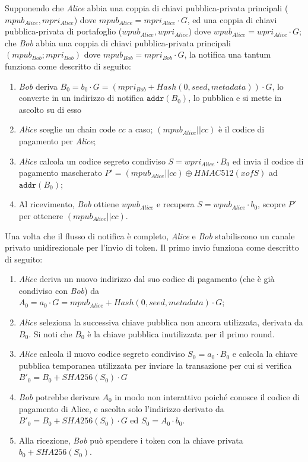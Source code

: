 Supponendo che \emph{Alice} abbia una coppia di chiavi pubblica-privata principali ($mpub_{Alice}, mpri_{Alice}$) dove $mpub_{Alice} = mpri_{Alice}\cdot G$, ed una coppia di chiavi pubblica-privata di portafoglio ($wpub_{Alice}, wpri_{Alice}$) dove $wpub_{Alice} = wpri_{Alice}\cdot G$; che \emph{Bob} abbia una coppia di chiavi pubblica-privata principali $(mpub_{Bob}; mpri_{Bob})$ dove $mpub_{Bob} = mpri_{Bob}\cdot G$, la notifica una tantum funziona come descritto di seguito:

\begin{enumerate}
	\item \emph{Bob} deriva $B_0 = b_0\cdot G = (mpri_{Bob} + Hash(0, seed, metadata))\cdot G$, lo converte in un indirizzo di notifica $\texttt{addr}(B_0)$, lo pubblica e si mette in ascolto su di esso

	\item  \emph{Alice} sceglie un chain code $cc$ a caso; $(mpub_{Alice}||cc)$ è il codice di pagamento per \emph{Alice};

	\item  \emph{Alice} calcola un codice segreto condiviso $S = wpri_{Alice}\cdot B_0$ ed invia il codice di  pagamento mascherato $P' = (mpub_{Alice}||cc)\oplus HMAC512(xofS)$ ad $\texttt{addr}(B_0)$;

	\item Al ricevimento, \emph{Bob} ottiene $wpub_{Alice}$ e recupera $S = wpub_{Alice}\cdot b_0$, scopre $P'$ per ottenere $(mpub_{Alice}||cc)$.
\end{enumerate}

Una volta che il flusso di notifica è completo, \emph{Alice} e \emph{Bob} stabiliscono un canale privato unidirezionale per l'invio di token. Il primo invio funziona come descritto di seguito:

\begin{enumerate}
	\item \emph{Alice} deriva un nuovo indirizzo dal suo codice di pagamento (che è già condiviso con \emph{Bob}) da $A_0 = a_0\cdot G = mpub_{Alice} + Hash(0, seed, metadata)\cdot G$;

	\item \emph{Alice} seleziona la successiva chiave pubblica non ancora utilizzata, derivata da $B_0$. Si noti che $B_0$ è la chiave pubblica inutilizzata per il primo round.

	\item \emph{Alice} calcola il nuovo codice segreto condiviso $S_0 = a_0\cdot B_0$ e calcola la chiave pubblica temporanea utilizzata per inviare la transazione per cui si verifica $B'_0 = B_0 + SHA256(S_0)\cdot G$

	\item \emph{Bob} potrebbe derivare $A_0$ in modo non interattivo poiché conosce il codice di pagamento di Alice, e ascolta solo l'indirizzo derivato da $B'_0 = B_0 + SHA256(S_0)\cdot G$ ed $S_0 = A_0\cdot b_0$.

	\item Alla ricezione, \emph{Bob} può spendere i token con la chiave privata $b_0 + SHA256(S_0)$.

\end{enumerate}

